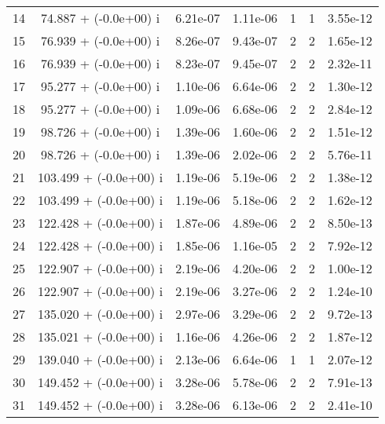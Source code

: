 \begin{table}[H]
\begin{center}
\begin{tabular}{|c|c|c|c|c|c|c|}
    14  &     74.887 + (-0.0e+00) i  &    6.21e-07      &   1.11e-06    &   1    &  1   &    3.55e-12 \\
    15  &     76.939 + (-0.0e+00) i  &    8.26e-07      &   9.43e-07    &   2    &  2   &    1.65e-12 \\
    16  &     76.939 + (-0.0e+00) i  &    8.23e-07      &   9.45e-07    &   2    &  2   &    2.32e-11 \\
    17  &     95.277 + (-0.0e+00) i  &    1.10e-06      &   6.64e-06    &   2    &  2   &    1.30e-12 \\
    18  &     95.277 + (-0.0e+00) i  &    1.09e-06      &   6.68e-06    &   2    &  2   &    2.84e-12 \\
    19  &     98.726 + (-0.0e+00) i  &    1.39e-06      &   1.60e-06    &   2    &  2   &    1.51e-12 \\
    20  &     98.726 + (-0.0e+00) i  &    1.39e-06      &   2.02e-06    &   2    &  2   &    5.76e-11 \\
    21  &    103.499 + (-0.0e+00) i  &    1.19e-06      &   5.19e-06    &   2    &  2   &    1.38e-12 \\
    22  &    103.499 + (-0.0e+00) i  &    1.19e-06      &   5.18e-06    &   2    &  2   &    1.62e-12 \\
    23  &    122.428 + (-0.0e+00) i  &    1.87e-06      &   4.89e-06    &   2    &  2   &    8.50e-13 \\
    24  &    122.428 + (-0.0e+00) i  &    1.85e-06      &   1.16e-05    &   2    &  2   &    7.92e-12 \\
    25  &    122.907 + (-0.0e+00) i  &    2.19e-06      &   4.20e-06    &   2    &  2   &    1.00e-12 \\
    26  &    122.907 + (-0.0e+00) i  &    2.19e-06      &   3.27e-06    &   2    &  2   &    1.24e-10 \\
    27  &    135.020 + (-0.0e+00) i  &    2.97e-06      &   3.29e-06    &   2    &  2   &    9.72e-13 \\
    28  &    135.021 + (-0.0e+00) i  &    1.16e-06      &   4.26e-06    &   2    &  2   &    1.87e-12 \\
    29  &    139.040 + (-0.0e+00) i  &    2.13e-06      &   6.64e-06    &   1    &  1   &    2.07e-12 \\
    30  &    149.452 + (-0.0e+00) i  &    3.28e-06      &   5.78e-06    &   2    &  2   &    7.91e-13 \\
    31  &    149.452 + (-0.0e+00) i  &    3.28e-06      &   6.13e-06    &   2    &  2   &    2.41e-10 \\

\end{tabular}
\end{center}
\end{table}
